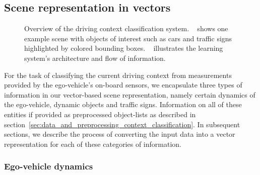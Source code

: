 \subsection{Scene representation in vectors}%
\label{subsec:scene_representation_in_vectors_context_classification}
\begin{figure}[t]
    \centering
    \caption{Overview of the driving context classification system.
    ~\protect{} shows one example scene with objects of interest such as cars and traffic signs highlighted by colored bounding boxes.
~\protect{} illustrates the learning system's architecture and flow of information.}
    \label{fig:context_class_sys_arch}
\end{figure}

For the task of classifying the current driving context from measurements provided by the ego-vehicle's on-board sensors, we encapsulate three types of information in our vector-based scene representation, namely certain dynamics of the ego-vehicle, dynamic objects and traffic signs.
Information on all of these entities if provided as preprocessed object-lists as described in section~\ref{sec:data_and_preprocessing_context_classification}.
In subsequent sections, we describe the process of converting the input data into a vector representation for each of these categories of information.

\subsubsection{Ego-vehicle dynamics}
\label{subsubsec:ego-veh-dyn}

